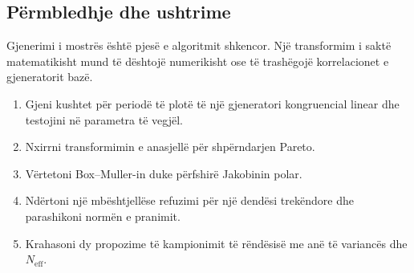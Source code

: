 \subsection{Përmbledhje dhe ushtrime}
Gjenerimi i mostrës është pjesë e algoritmit shkencor. Një transformim i saktë matematikisht mund të dështojë numerikisht ose të trashëgojë korrelacionet e gjeneratorit bazë.
\begin{enumerate}
\item Gjeni kushtet për periodë të plotë të një gjeneratori kongruencial linear dhe testojini në parametra të vegjël.
\item Nxirrni transformimin e anasjellë për shpërndarjen Pareto.
\item Vërtetoni Box--Muller-in duke përfshirë Jakobinin polar.
\item Ndërtoni një mbështjellëse refuzimi për një dendësi trekëndore dhe parashikoni normën e pranimit.
\item Krahasoni dy propozime të kampionimit të rëndësisë me anë të variancës dhe $N_{\mathrm{eff}}$.
\end{enumerate}
